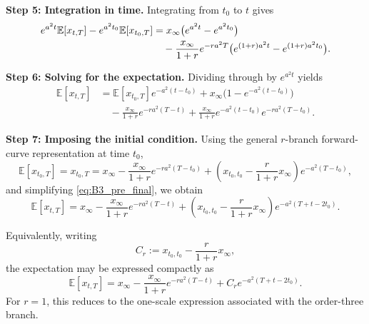 \documentclass[12pt]{article}
\theoremstyle{statementstyle}
\begin{document}
\begin{appendices}
\medskip
\noindent\textbf{Step 5: Integration in time.}
Integrating from \(t_0\) to \(t\) gives
\begin{align}
e^{a^{2}t}\mathbb{E}[x_{t,T}]
-
e^{a^{2}t_0}\mathbb{E}[x_{t_0,T}]
&=
x_{\infty}\bigl(e^{a^{2}t}-e^{a^{2}t_0}\bigr)
\nonumber\\
&\quad
-
\frac{x_{\infty}}{1+r}e^{-ra^{2}T}
\bigl(e^{(1+r)a^{2}t}-e^{(1+r)a^{2}t_0}\bigr).
\notag
\end{align}

\medskip
\noindent\textbf{Step 6: Solving for the expectation.}
Dividing through by \(e^{a^{2}t}\) yields
\begin{align}
\mathbb{E}[x_{t,T}]
&=
\mathbb{E}[x_{t_0,T}]e^{-a^{2}(t-t_0)}
+
x_{\infty}\bigl(1-e^{-a^{2}(t-t_0)}\bigr)
\nonumber\\
&\quad
-
\frac{x_{\infty}}{1+r}e^{-ra^{2}(T-t)}
+
\frac{x_{\infty}}{1+r}e^{-a^{2}(t-t_0)}e^{-ra^{2}(T-t_0)}.
\label{eq:B3_pre_final}
\tag{B.3.4}
\end{align}

\medskip
\noindent\textbf{Step 7: Imposing the initial condition.}
Using the general \(r\)-branch forward-curve representation at time \(t_0\),
\[
\mathbb{E}[x_{t_0,T}]=x_{t_0,T}
=
x_{\infty}
-
\frac{x_{\infty}}{1+r}e^{-ra^{2}(T-t_0)}
+
\left(x_{t_0,t_0}-\frac{r}{1+r}x_{\infty}\right)e^{-a^{2}(T-t_0)},
\]
and simplifying \eqref{eq:B3_pre_final}, we obtain
\begin{equation}
\boxed{
\mathbb{E}[x_{t,T}]
=
x_{\infty}
-
\frac{x_{\infty}}{1+r}e^{-ra^{2}(T-t)}
+
\left(x_{t_0,t_0}-\frac{r}{1+r}x_{\infty}\right)
e^{-a^{2}(T+t-2t_0)}.
}
\label{eq:B3_final_expectation}
\tag{B.3.5}
\end{equation}

Equivalently, writing
\[
C_r:=x_{t_0,t_0}-\frac{r}{1+r}x_{\infty},
\]
the expectation may be expressed compactly as
\begin{equation}
\boxed{
\mathbb{E}[x_{t,T}]
=
x_{\infty}
-
\frac{x_{\infty}}{1+r}e^{-ra^{2}(T-t)}
+
C_r e^{-a^{2}(T+t-2t_0)}.
}
\tag{B.3.6}\label{eq:B36}
\end{equation}
For \(r=1\), this reduces to the one-scale expression associated with the order-three branch.



\end{appendices}
\end{document}
